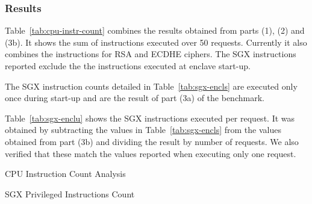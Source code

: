 \documentclass[../../../main.tex]{subfiles}
\begin{document}
\subsubsection*{Results}
Table~\ref{tab:cpu-instr-count} combines the results obtained from parts (1),
(2) and (3b). It shows the sum of instructions executed over 50 requests.
Currently it also combines the instructions for RSA and ECDHE ciphers. The SGX
instructions reported exclude the the instructions executed at enclave start-up.

The SGX instruction counts detailed in Table~\ref{tab:sgx-encls} are executed
only once during start-up and are the result of part (3a) of the benchmark.

Table~\ref{tab:sgx-enclu} shows the SGX instructions executed per request. It
was obtained by subtracting the values in Table~\ref{tab:sgx-encls} from the
values obtained from part (3b) and dividing the result by number of requests.
We also verified that these match the values reported when executing only one
request.


\begin{table}[H]
  \caption{CPU Instruction Count Analysis}
  \label{tab:cpu-instr-count}
\end{table}

\begin{table}[H]
  \center
  \footnotesize
  \caption{SGX Privileged Instructions Count}
  \label{tab:sgx-encls}
\end{table}
\end{document}
